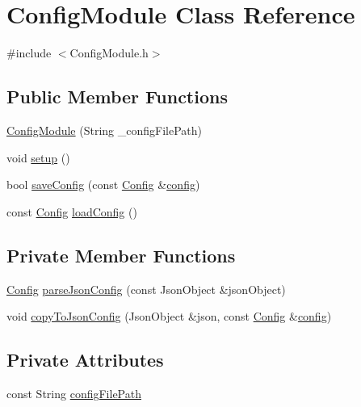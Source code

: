 \hypertarget{class_config_module}{}\section{Config\+Module Class Reference}
\label{class_config_module}


{\ttfamily \#include $<$Config\+Module.\+h$>$}

\subsection*{Public Member Functions}
\begin{DoxyCompactItemize}
\item 
\mbox{\hyperlink{class_config_module_a0f7c95e0a768a56c7f4ff835b09657b2}{Config\+Module}} (String \+\_\+config\+File\+Path)
\item 
void \mbox{\hyperlink{class_config_module_a3ab8220b02e11fdb12af8111ef77c6ac}{setup}} ()
\item 
bool \mbox{\hyperlink{class_config_module_ab7b7cb9aba4ab90bec664eef2b4a00f3}{save\+Config}} (const \mbox{\hyperlink{struct_config}{Config}} \&\mbox{\hyperlink{main_8cpp_a4a8dd3a2de125b72d4fe6251a0a271b5}{config}})
\item 
const \mbox{\hyperlink{struct_config}{Config}} \mbox{\hyperlink{class_config_module_a1a9cda5559839cac0f4444d6352e9067}{load\+Config}} ()
\end{DoxyCompactItemize}
\subsection*{Private Member Functions}
\begin{DoxyCompactItemize}
\item 
\mbox{\hyperlink{struct_config}{Config}} \mbox{\hyperlink{class_config_module_a937d05a9dd8761526d35b648d5823030}{parse\+Json\+Config}} (const Json\+Object \&json\+Object)
\item 
void \mbox{\hyperlink{class_config_module_a19014d9b2ce8d8dee2333a52886d86d8}{copy\+To\+Json\+Config}} (Json\+Object \&json, const \mbox{\hyperlink{struct_config}{Config}} \&\mbox{\hyperlink{main_8cpp_a4a8dd3a2de125b72d4fe6251a0a271b5}{config}})
\end{DoxyCompactItemize}
\subsection*{Private Attributes}
\begin{DoxyCompactItemize}
\item 
const String \mbox{\hyperlink{class_config_module_a0738d7b1088e75c5503a894e88d439aa}{config\+File\+Path}}
\end{DoxyCompactItemize}


